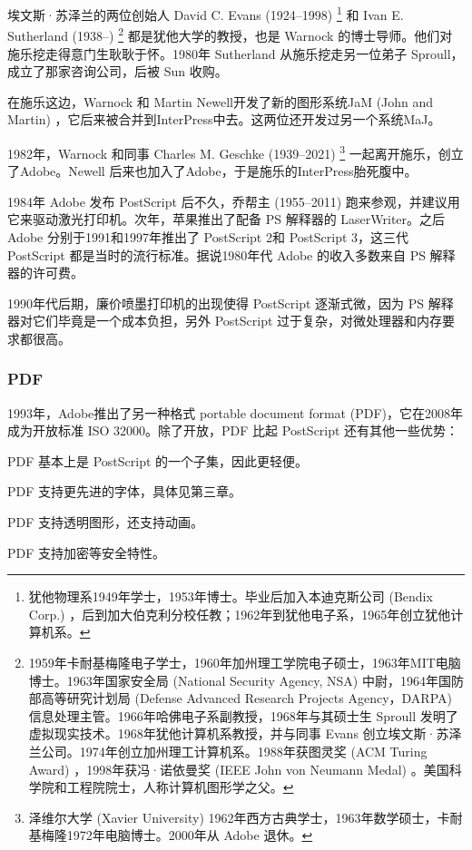 埃文斯·苏泽兰的两位创始人 David C. Evans (1924--1998)\indexEvans{} \footnote{犹他物理系1949年学士，1953年博士。毕业后加入本迪克斯公司 (Bendix Corp.) ，后到加大伯克利分校任教；1962年到犹他电子系，1965年创立犹他计算机系。} 和 Ivan E. Sutherland (1938--)\indexSutherland{} \footnote{1959年卡耐基梅隆电子学士，1960年加州理工学院电子硕士，1963年MIT电脑博士。1963年国家安全局 (National Security Agency, NSA) 中尉，1964年国防部高等研究计划局 (Defense Advanced Research Projects Agency，DARPA) 信息处理主管。1966年哈佛电子系副教授，1968年与其硕士生 Sproull 发明了虚拟现实技术。1968年犹他计算机系教授，并与同事 Evans 创立埃文斯·苏泽兰公司。1974年创立加州理工计算机系。1988年获图灵奖 (ACM Turing Award) ，1998年获冯·诺依曼奖 (IEEE John von Neumann Medal) 。美国科学院和工程院院士，人称计算机图形学之父。} 都是犹他大学的教授，也是 Warnock 的博士导师。他们对施乐挖走得意门生耿耿于怀。1980年 Sutherland 从施乐挖走另一位弟子 Sproull，成立了那家咨询公司，后被 Sun 收购。

在施乐这边，Warnock 和 Martin Newell\indexNewell 开发了新的图形系统JaM (John and Martin) ，它后来被合并到InterPress中去。这两位还开发过另一个系统MaJ。

1982年，Warnock 和同事 Charles M. Geschke (1939--2021)\indexGeschke{} \footnote{泽维尔大学 (Xavier University) 1962年西方古典学士，1963年数学硕士，卡耐基梅隆1972年电脑博士。2000年从 Adobe 退休。} 一起离开施乐，创立了Adobe\indexAdobe{}。Newell 后来也加入了Adobe，于是施乐的InterPress胎死腹中。

1984年 Adobe 发布 PostScript 后不久，乔帮主 (1955--2011)\indexJobs{} 跑来参观，并建议用它来驱动激光打印机。次年，苹果推出了配备 PS 解释器的 LaserWriter。之后 Adobe 分别于1991和1997年推出了 PostScript 2和 PostScript 3，这三代 PostScript 都是当时的流行标准。据说1980年代 Adobe 的收入多数来自 PS 解释器的许可费。

1990年代后期，廉价喷墨打印机的出现使得 PostScript 逐渐式微，因为 PS 解释器对它们毕竟是一个成本负担，另外 PostScript 过于复杂，对微处理器和内存要求都很高。

\subsubsection{PDF}
1993年，Adobe推出了另一种格式 portable document format (PDF)，它在2008年成为开放标准 ISO\indexISO{} 32000。除了开放，PDF 比起 PostScript 还有其他一些优势：

\begin{compactitem}
  \item PDF 基本上是 PostScript 的一个子集，因此更轻便。
  \item PDF 支持更先进的字体，具体见第三章。
  \item PDF 支持透明图形，还支持动画。
  \item PDF 支持加密等安全特性。
\end{compactitem}

